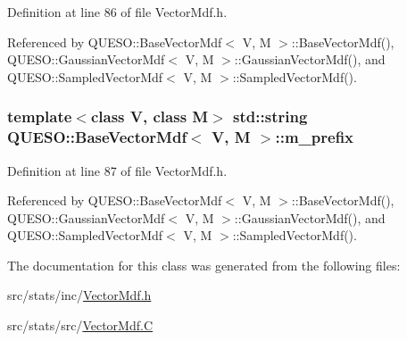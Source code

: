 Definition at line 86 of file Vector\-Mdf.\-h.



Referenced by Q\-U\-E\-S\-O\-::\-Base\-Vector\-Mdf$<$ V, M $>$\-::\-Base\-Vector\-Mdf(), Q\-U\-E\-S\-O\-::\-Gaussian\-Vector\-Mdf$<$ V, M $>$\-::\-Gaussian\-Vector\-Mdf(), and Q\-U\-E\-S\-O\-::\-Sampled\-Vector\-Mdf$<$ V, M $>$\-::\-Sampled\-Vector\-Mdf().

\hypertarget{class_q_u_e_s_o_1_1_base_vector_mdf_ada097dfdcb97838d0bd71a25ed7a4193}{
\subsubsection[{m\-\_\-prefix}]{\setlength{\rightskip}{0pt plus 5cm}template$<$class V, class M$>$ std\-::string {\bf Q\-U\-E\-S\-O\-::\-Base\-Vector\-Mdf}$<$ V, M $>$\-::m\-\_\-prefix\hspace{0.3cm}{\ttfamily [protected]}}}\label{class_q_u_e_s_o_1_1_base_vector_mdf_ada097dfdcb97838d0bd71a25ed7a4193}


Definition at line 87 of file Vector\-Mdf.\-h.



Referenced by Q\-U\-E\-S\-O\-::\-Base\-Vector\-Mdf$<$ V, M $>$\-::\-Base\-Vector\-Mdf(), Q\-U\-E\-S\-O\-::\-Gaussian\-Vector\-Mdf$<$ V, M $>$\-::\-Gaussian\-Vector\-Mdf(), and Q\-U\-E\-S\-O\-::\-Sampled\-Vector\-Mdf$<$ V, M $>$\-::\-Sampled\-Vector\-Mdf().



The documentation for this class was generated from the following files\-:\begin{DoxyCompactItemize}
\item 
src/stats/inc/\hyperlink{_vector_mdf_8h}{Vector\-Mdf.\-h}\item 
src/stats/src/\hyperlink{_vector_mdf_8_c}{Vector\-Mdf.\-C}\end{DoxyCompactItemize}
